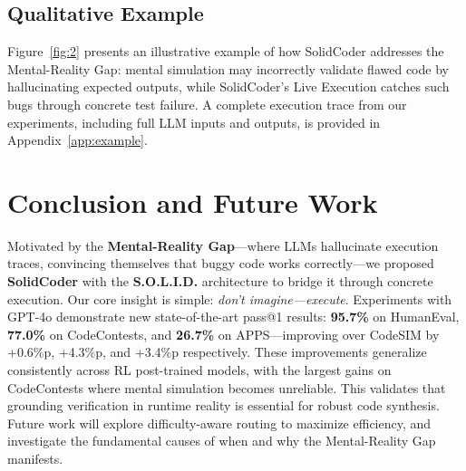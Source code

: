\documentclass[11pt]{article}
\begin{document}
\subsection{Qualitative Example}
Figure~\ref{fig:2} presents an illustrative example of how SolidCoder addresses the Mental-Reality Gap: mental simulation may incorrectly validate flawed code by hallucinating expected outputs, while SolidCoder's Live Execution catches such bugs through concrete test failure. A complete execution trace from our experiments, including full LLM inputs and outputs, is provided in Appendix~\ref{app:example}.

\section{Conclusion and Future Work}
Motivated by the \textbf{Mental-Reality Gap}---where LLMs hallucinate execution traces, convincing themselves that buggy code works correctly---we proposed \textbf{SolidCoder} with the \textbf{S.O.L.I.D.} architecture to bridge it through concrete execution. Our core insight is simple: \textit{don't imagine---execute}. Experiments with GPT-4o demonstrate new state-of-the-art pass@1 results: \textbf{95.7\%} on HumanEval, \textbf{77.0\%} on CodeContests, and \textbf{26.7\%} on APPS---improving over CodeSIM by +0.6\%p, +4.3\%p, and +3.4\%p respectively. These improvements generalize consistently across RL post-trained models, with the largest gains on CodeContests where mental simulation becomes unreliable. This validates that grounding verification in runtime reality is essential for robust code synthesis. Future work will explore difficulty-aware routing to maximize efficiency, and investigate the fundamental causes of when and why the Mental-Reality Gap manifests.
\end{document}
